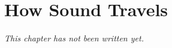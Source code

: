 \chapter{How Sound Travels}\label{ch:g4:how-sound-travels}


\emph{This chapter has not been written yet.}
